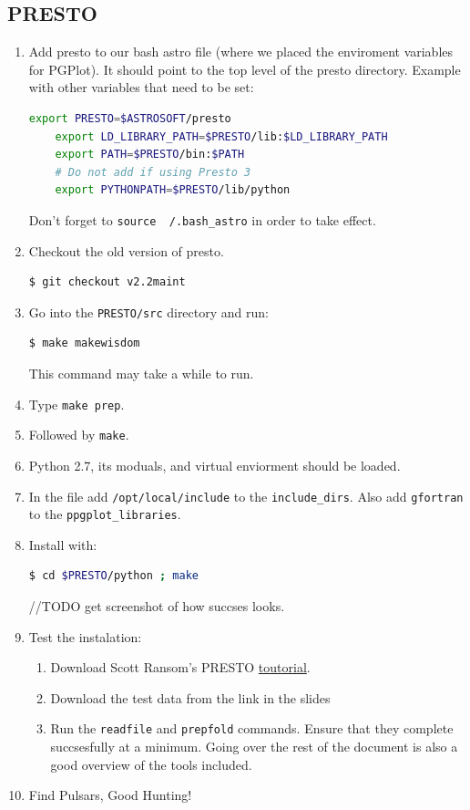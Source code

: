 \documentclass{article}
\begin{document}
\subsection{PRESTO}
\begin{enumerate}
    \item Add presto to our bash astro file (where we placed the enviroment variables for PGPlot). It should point to the top level of the presto directory. Example with other variables that need to be set: \begin{lstlisting}[language=bash]
    export PRESTO=$ASTROSOFT/presto
    export LD_LIBRARY_PATH=$PRESTO/lib:$LD_LIBRARY_PATH 
    export PATH=$PRESTO/bin:$PATH
    # Do not add if using Presto 3
    export PYTHONPATH=$PRESTO/lib/python 
    \end{lstlisting}
    Don't forget to \texttt{source ~/.bash\_astro} in order to take effect. 
    \item Checkout the old version of presto. \begin{lstlisting}[language=bash]
    $ git checkout v2.2maint
    \end{lstlisting}
    \item Go into the \texttt{PRESTO/src} directory and run:  \begin{lstlisting}[language=bash]
    $ make makewisdom 
    \end{lstlisting}
    This command may take a while to run. 
    \item Type \texttt{make prep}.
    \item Followed by \texttt{make}.
    \item Python 2.7, its moduals, and virtual enviorment should be loaded.
    \item In the  file add \texttt{/opt/local/include} to the \texttt{include\_dirs}. Also add \texttt{gfortran} to the \texttt{ppgplot\_libraries}.
    \item Install with: \begin{lstlisting}[language=bash]     
    $ cd $PRESTO/python ; make
        \end{lstlisting}
    //TODO get screenshot of how succses looks.
    \item Test the instalation: 
        \begin{enumerate}
        \item Download Scott Ransom's PRESTO \href{https://www.cv.nrao.edu/~sransom/PRESTO_search_tutorial.pdf}{toutorial}.
        \item Download the test data from the link in the slides
        \item Run the \texttt{readfile} and \texttt{prepfold} commands. Ensure that they complete succsesfully at a minimum. Going over the rest of the document is also a good overview of the tools included.
        \end{enumerate}
    \item Find Pulsars, Good Hunting!
\end{enumerate}
\end{document}
